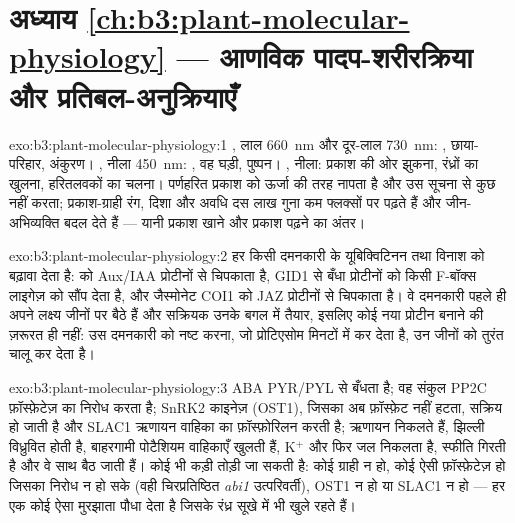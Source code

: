 \section*{अध्याय \ref{ch:b3:plant-molecular-physiology} --- आणविक पादप-शरीरक्रिया और प्रतिबल-अनुक्रियाएँ}

\begin{solution}{exo:b3:plant-molecular-physiology:1}
, लाल \qty{660}{nm} और दूर-लाल \qty{730}{nm}: ,
छाया-परिहार, अंकुरण। , नीला \qty{450}{nm}: , वह
घड़ी, पुष्पन। , नीला: प्रकाश की ओर झुकना, रंध्रों का खुलना,
हरितलवकों का चलना। पर्णहरित प्रकाश को ऊर्जा की तरह नापता है और उस सूचना
से कुछ नहीं करता; प्रकाश-ग्राही रंग, दिशा और अवधि दस लाख गुना कम
फ्लक्सों पर पढ़ते हैं और जीन-अभिव्यक्ति बदल देते हैं --- यानी प्रकाश
खाने और प्रकाश पढ़ने का अंतर।
\end{solution}

\begin{solution}{exo:b3:plant-molecular-physiology:2}
हर  किसी दमनकारी के यूबिक्विटिनन तथा विनाश को बढ़ावा देता है:
  को Aux/IAA प्रोटीनों से चिपकाता है, GID1 से बँधा 
 प्रोटीनों को किसी F-बॉक्स लाइगेज़ को सौंप देता है, और जैस्मोनेट
COI1 को JAZ प्रोटीनों से चिपकाता है। वे दमनकारी पहले ही अपने लक्ष्य
जीनों पर बैठे हैं और सक्रियक उनके बगल में तैयार, इसलिए कोई नया प्रोटीन
बनाने की ज़रूरत ही नहीं: उस दमनकारी को नष्ट करना, जो प्रोटिएसोम मिनटों
में कर देता है, उन जीनों को तुरंत चालू कर देता है।
\end{solution}

\begin{solution}{exo:b3:plant-molecular-physiology:3}
ABA PYR/PYL से बँधता है; वह संकुल PP2C फ़ॉस्फ़ेटेज़ का निरोध करता है;
SnRK2 काइनेज़ (OST1), जिसका अब फ़ॉस्फ़ेट नहीं हटता, सक्रिय हो जाती है
और SLAC1 ऋणायन वाहिका का फ़ॉस्फ़ोरिलन करती है; ऋणायन निकलते हैं,
झिल्ली विध्रुवित होती है, बाहरगामी पोटैशियम वाहिकाएँ खुलती हैं,
K$^{+}$ और फिर जल निकलता है, स्फीति गिरती है और वे  साथ
बैठ जाती हैं। कोई भी कड़ी तोड़ी जा सकती है: कोई ग्राही न हो, कोई ऐसी
फ़ॉस्फ़ेटेज़ हो जिसका निरोध न हो सके (वही चिरप्रतिष्ठित \emph{abi1}
उत्परिवर्ती), OST1 न हो या SLAC1 न हो --- हर एक कोई ऐसा मुरझाता पौधा
देता है जिसके रंध्र सूखे में भी खुले रहते हैं।
\end{solution}

